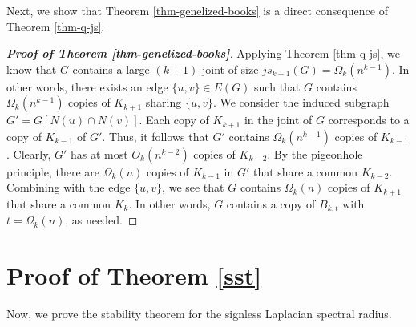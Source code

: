 \documentclass[11pt,a4paper]{article}
\theoremstyle{plain}
\theoremstyle{definition}
\begin{document}
Next, we show that 
Theorem \ref{thm-genelized-books} is a direct consequence of Theorem \ref{thm-q-js}. 

\begin{proof}[{\bf Proof of Theorem \ref{thm-genelized-books}}]
 Applying Theorem \ref{thm-q-js}, 
we know that $G$ contains a large $(k+1)$-joint of size $js_{k+1}(G)=\Omega_k(n^{k-1})$. 
In other words, there exists an edge $\{u,v\}\in E(G)$ such that $G$ contains $\Omega_k(n^{k-1})$ copies of $K_{k+1}$ sharing $\{u,v\}$. 
 We consider the induced subgraph $G'=G[N(u)\cap N(v)]$. 
 Each copy of $K_{k+1}$ in the joint of $G$  corresponds to a copy of $K_{k-1}$ of $G'$. 
 Thus, it follows that 
 $G'$ contains $\Omega_k(n^{k-1})$ copies of 
 $K_{k-1}$. Clearly, $G'$ has at most $O_k(n^{k-2})$ copies of $K_{k-2}$. 
 By the pigeonhole principle, there are 
 $\Omega_k(n)$ copies of $K_{k-1}$ in $G'$ that share a common $K_{k-2}$. 
 Combining with the edge $\{u,v\}$, 
 we see that $G$ contains $\Omega_k(n)$ copies of $K_{k+1}$ that share a common $K_k$. In other words, $G$ contains a copy of $B_{k,t}$ 
 with $t=\Omega_k(n)$, as needed. 
\end{proof}





\section{Proof of Theorem \ref{sst}}

\label{sec-6}


Now, we prove the stability theorem for the signless Laplacian spectral radius. 
\end{document}
